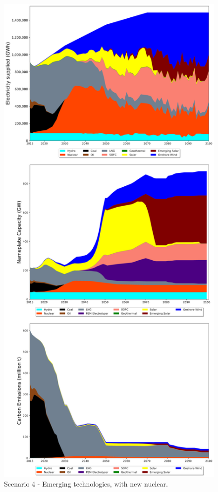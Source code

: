 \begin{figure}[h] 
\centering
\vspace*{-3cm}
\includegraphics[scale=0.41]{figures/newtechs_nuc}
\caption{Scenario 4 - Emerging technologies, with new nuclear.}
\label{scen4}
\end{figure}

